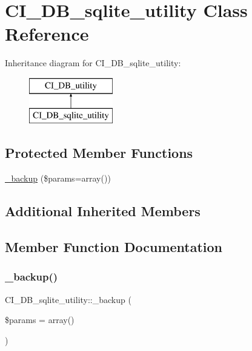 \hypertarget{class_c_i___d_b__sqlite__utility}{}\section{C\+I\+\_\+\+D\+B\+\_\+sqlite\+\_\+utility Class Reference}
\label{class_c_i___d_b__sqlite__utility}
Inheritance diagram for C\+I\+\_\+\+D\+B\+\_\+sqlite\+\_\+utility\+:\begin{figure}[H]
\begin{center}
\leavevmode
\includegraphics[height=2.000000cm]{class_c_i___d_b__sqlite__utility}
\end{center}
\end{figure}
\subsection*{Protected Member Functions}
\begin{DoxyCompactItemize}
\item 
\mbox{\hyperlink{class_c_i___d_b__sqlite__utility_a7c58f76e0747a6b826d8d4f63464539e}{\+\_\+backup}} (\$params=array())
\end{DoxyCompactItemize}
\subsection*{Additional Inherited Members}


\subsection{Member Function Documentation}
\mbox{\label{class_c_i___d_b__sqlite__utility_a7c58f76e0747a6b826d8d4f63464539e}} 
\subsubsection{\texorpdfstring{\+\_\+backup()}{\_backup()}}
{\footnotesize\ttfamily C\+I\+\_\+\+D\+B\+\_\+sqlite\+\_\+utility\+::\+\_\+backup (\begin{DoxyParamCaption}\item[{}]{\$params = {\ttfamily array()} }\end{DoxyParamCaption})\hspace{0.3cm}{\ttfamily [protected]}}

